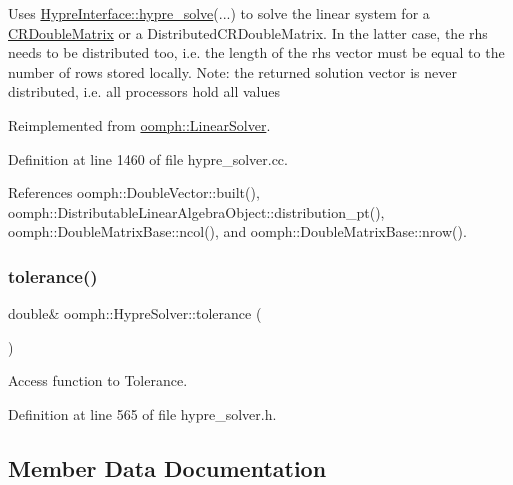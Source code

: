 Uses \hyperlink{classoomph_1_1HypreInterface_a5cdd3f8621333e94d8a1004611bc6793}{Hypre\+Interface\+::hypre\+\_\+solve}(...) to solve the linear system for a \hyperlink{classoomph_1_1CRDoubleMatrix}{C\+R\+Double\+Matrix} or a Distributed\+C\+R\+Double\+Matrix. In the latter case, the rhs needs to be distributed too, i.\+e. the length of the rhs vector must be equal to the number of rows stored locally. Note\+: the returned solution vector is never distributed, i.\+e. all processors hold all values 

Reimplemented from \hyperlink{classoomph_1_1LinearSolver_a546c09822d18191df14caed864c04c09}{oomph\+::\+Linear\+Solver}.



Definition at line 1460 of file hypre\+\_\+solver.\+cc.



References oomph\+::\+Double\+Vector\+::built(), oomph\+::\+Distributable\+Linear\+Algebra\+Object\+::distribution\+\_\+pt(), oomph\+::\+Double\+Matrix\+Base\+::ncol(), and oomph\+::\+Double\+Matrix\+Base\+::nrow().

\mbox{\label{classoomph_1_1HypreSolver_a54945bba18bf066450b85ba21145656a}} 
\subsubsection{\texorpdfstring{tolerance()}{tolerance()}}
{\footnotesize\ttfamily double\& oomph\+::\+Hypre\+Solver\+::tolerance (\begin{DoxyParamCaption}{ }\end{DoxyParamCaption})\hspace{0.3cm}{\ttfamily [inline]}}



Access function to Tolerance. 



Definition at line 565 of file hypre\+\_\+solver.\+h.



\subsection{Member Data Documentation}
\mbox{\label{classoomph_1_1HypreSolver_a79047c84718f95a88ba3c41e1d3963e7}} 
